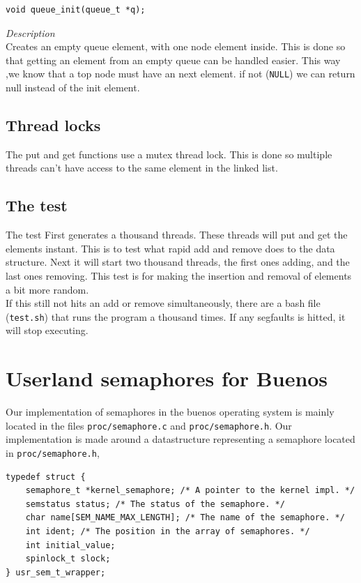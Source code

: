 \documentclass[11pt]{article}
\begin{document}
\begin{lstlisting}[style=customc]
void queue_init(queue_t *q);
\end{lstlisting}
\textit{Description} \\
Creates an empty queue element, with one node element inside. This is done so that getting an element from an empty queue can be handled easier. This way ,we know that a top node must have an next element. if not (\texttt{NULL}) we can return null instead of the init element.

\subsection{Thread locks}
The put and get functions use a mutex thread lock. This is done so multiple threads can't have access to the same element in the linked list.
\subsection{The test}
The test First generates a thousand threads. These threads will put and get the elements instant. This
is to test what rapid add and remove does to the data structure.
Next it will start two thousand threads, the first ones adding, and the last ones removing. This test is for making the insertion and removal of elements a bit more random.\\
If this still not hits an add or remove simultaneously, there are a bash file (\texttt{test.sh}) that runs the program a thousand times. If any segfaults is hitted, it will stop executing.  

\section{Userland semaphores for Buenos}
    Our implementation of semaphores in the buenos operating system is mainly
    located in the files \texttt{proc/semaphore.c} and
    \texttt{proc/semaphore.h}.  Our implementation is made around a
    datastructure representing a semaphore located in \texttt{proc/semaphore.h},

    \begin{lstlisting}[style=customc]
typedef struct {
    semaphore_t *kernel_semaphore; /* A pointer to the kernel impl. */
    semstatus status; /* The status of the semaphore. */
    char name[SEM_NAME_MAX_LENGTH]; /* The name of the semaphore. */
    int ident; /* The position in the array of semaphores. */
    int initial_value;
    spinlock_t slock;
} usr_sem_t_wrapper;
    \end{lstlisting}
\end{document}
